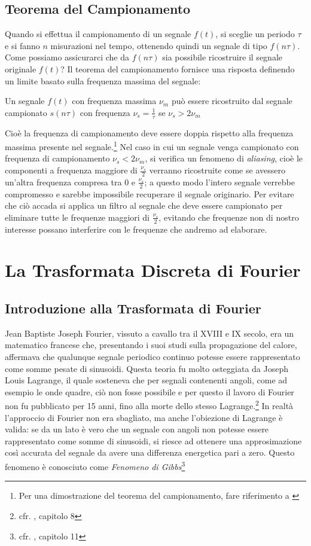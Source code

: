 \subsection{Teorema del Campionamento}
Quando si effettua il campionamento di un segnale $f(t)$, si sceglie un periodo
$\tau$ e si fanno $n$ misurazioni nel tempo, ottenendo quindi un segnale di
tipo $f(n\tau)$. Come possiamo assicurarci che da $f(n\tau)$ sia possibile
ricostruire il segnale originale $f(t)$?
Il teorema del campionamento fornisce una risposta definendo un limite basato
sulla frequenza massima del segnale:
\begin{theorem} \label{the:nyquist}
	Un segnale $f(t)$ con frequenza massima $\nu_m$ pu\`o essere ricostruito dal
	segnale campionato $s(n\tau)$ con frequenza $\nu_s = \frac{1}{\tau}$ se
	$\nu_s > 2\nu_m$
\end{theorem}
Cio\`e la frequenza di campionamento deve essere doppia rispetto alla frequenza
massima presente nel segnale.\footnote{Per una dimostrazione del teorema del
campionamento, fare riferimento a \cite{MDFT07}} Nel caso in cui un segnale venga campionato con
frequenza di campionamento $\nu_s < 2\nu_m$, si verifica un fenomeno di
\emph{aliasing}, cio\`e le componenti a frequenza maggiore di $\frac{\nu_s}{2}$
verranno ricostruite come se avessero un'altra frequenza compresa tra $0$ e
$\frac{\nu_s}{2}$; a questo modo l'intero segnale verrebbe compromesso e sarebbe
impossibile recuperare il segnale originario. Per evitare che ci\`o accada si
applica un filtro al segnale che deve essere campionato per eliminare tutte le
frequenze maggiori di $\frac{\nu_s}{2}$, evitando che frequenze non di nostro
interesse possano interferire con le frequenze che andremo ad elaborare.

\section{La Trasformata Discreta di Fourier}
\subsection{Introduzione alla Trasformata di Fourier}
Jean Baptiste Joseph Fourier, vissuto a cavallo tra il XVIII e IX secolo, era
un matematico francese che, presentando i suoi  studi sulla propagazione del
calore, affermava che qualunque segnale periodico continuo potesse essere
rappresentato come somme pesate di sinusoidi. Questa teoria fu molto osteggiata
da Joseph Louis Lagrange, il quale sosteneva che per segnali contenenti angoli,
come ad esempio le onde quadre, ci\`o non fosse possibile e per questo il
lavoro di Fourier non fu pubblicato per 15 anni, fino alla morte dello stesso
Lagrange.\footnote{cfr. \cite{TSEGDSP97}, capitolo 8} In realt\`a l'approccio di
Fourier non era sbagliato, ma anche l'obiezione di Lagrange \`e valida: se da un
lato \`e vero che un segnale con angoli non potesse essere rappresentato come
somme di sinusoidi, si riesce ad ottenere una approsimazione cos\`i accurata del
segnale da avere una differenza energetica pari a zero.  Questo fenomeno \`e
conosciuto come \emph{Fenomeno di Gibbs}\footnote{cfr.  \cite{TSEGDSP97},
capitolo 11}


